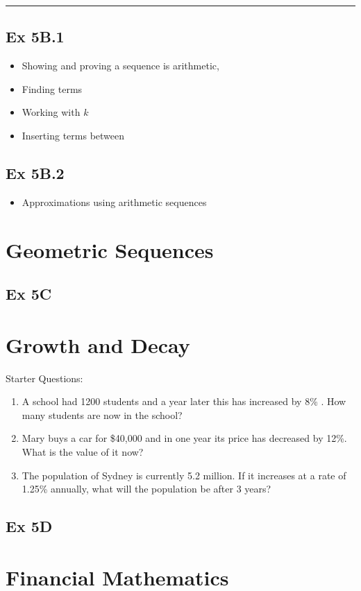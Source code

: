 \documentclass[12pt]{article}
\begin{document}
\vspace{0.5cm}\hrule

	
\subsection{Ex 5B.1}
\begin{itemize}
	\item Showing and proving a sequence is arithmetic, 
	\item Finding terms 
	\item Working with $k$
	\item Inserting terms between
\end{itemize}
 
\subsection{Ex 5B.2}
\begin{itemize}
	\item Approximations using arithmetic sequences
\end{itemize}
\section{Geometric  Sequences}
\subsection{Ex 5C}
\section{Growth and Decay}
Starter Questions:
\begin{enumerate}
	\item A school had 1200 students and a year later this has increased by 8\% . How many students are now in the school?
	\item Mary buys a car for \$40,000 and in one year its price has decreased by 12\%. What is the value of it now?
	\item The population of Sydney is currently 5.2 million. If it increases at a rate of 1.25\% annually, what will the population be after 3 years?
\end{enumerate}
\subsection{Ex 5D}
\section{Financial Mathematics}
\end{document}
